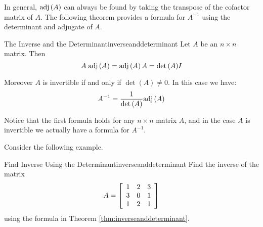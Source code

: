 In general, $\mbox{adj}\left(A\right)$ can always be found by taking the transpose of the cofactor matrix of $A$. The following theorem provides a formula for $A^{-1}$ using the determinant and adjugate of $A$.

\begin{theorem}{The Inverse and the Determinant}{inverseanddeterminant}
Let $A$ be an  $n\times n$ matrix. Then  
\begin{equation*}
A \; \mbox{adj}\left(A\right) = \mbox{adj}\left(A\right)A = {\det \left(A\right)} I
\end{equation*}

Moreover $A$ is invertible if and only if  $\det \left(A\right) \neq 0$. In this case we have: 
\begin{equation*}
A^{-1} = \frac{1}{\det \left(A\right)}  \mbox{adj}\left(A\right)
\end{equation*}
\end{theorem}


Notice that the first formula holds for any $n \times n$ matrix $A$, and in the case $A$ is invertible we actually have a formula for $A^{-1}$.

Consider the following example.

\begin{example}{Find Inverse Using the Determinant}{inverseanddeterminant}
Find the inverse of the matrix
\begin{equation*}
A=\left[
\begin{array}{rrr}
1 & 2 & 3 \\
3 & 0 & 1 \\
1 & 2 & 1
\end{array}
\right]
\end{equation*}
using the formula in Theorem \ref{thm:inverseanddeterminant}.
\end{example}

